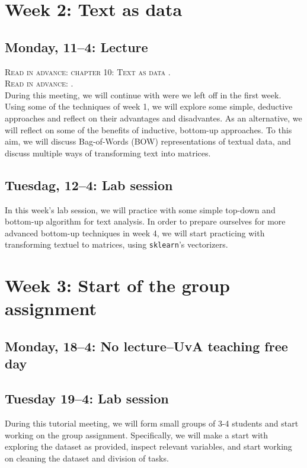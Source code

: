 \section*{Week 2: Text as data}

\subsection*{Monday, 11--4: Lecture}
\textsc{Read in advance: chapter 10: Text as data \cite{van2021computational}.} \\
\textsc{Read in advance: \cite{Boumans2016}.} \\

During this meeting, we will continue with were we left off in the first week. Using some of the techniques of week 1, we will explore some simple, deductive approaches and reflect on their advantages and disadvantes. As an alternative, we will reflect on some of the benefits of inductive, bottom-up approaches. To this aim, we will discuss Bag-of-Words (BOW) representations of textual data, and discuss multiple ways of transforming text into matrices. 

\subsection*{Tuesdag, 12--4: Lab session}
In this week's lab session, we will practice with some simple top-down and bottom-up algorithm for text analysis. In order to prepare ourselves for more advanced bottom-up techniques in week 4, we will start practicing with transforming textuel to matrices, using  \texttt{sklearn}'s vectorizers. 

\section*{Week 3: Start of the group assignment}

\subsection*{Monday, 18--4: No lecture--UvA teaching free day}

\subsection*{Tuesday 19--4: Lab session}
During this tutorial meeting, we will form small groups of 3-4 students and start working on the group assignment. Specifically, we will make a start with exploring the dataset as provided, inspect relevant variables, and start working on cleaning the dataset and division of tasks. 

